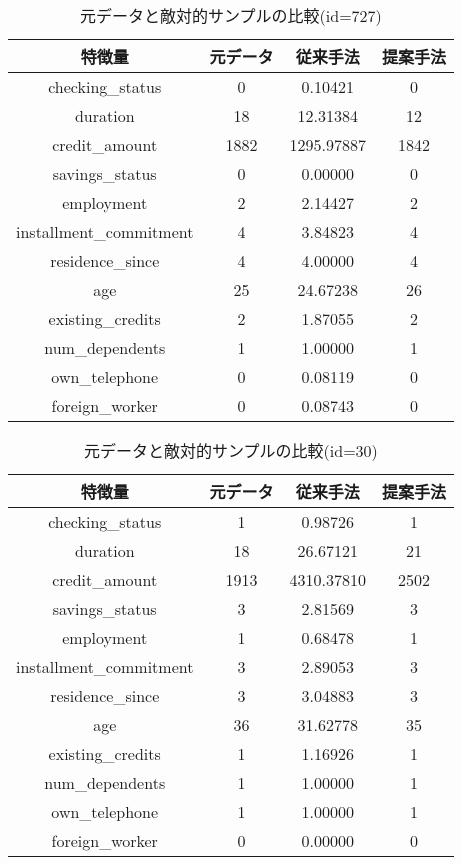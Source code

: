 \begin{table}[H]
    \centering
    \caption{元データと敵対的サンプルの比較(id=727)}
    \begin{tabular}{|c|c|c|c|} \hline
        特徴量 & 元データ & 従来手法 & 提案手法 \\ \hline
        checking\_status & 0 & 0.10421 & 0 \\ \hline
        duration & 18 & 12.31384 & 12 \\ \hline
        credit\_amount & 1882 & 1295.97887 & 1842 \\ \hline
        savings\_status & 0 & 0.00000 & 0 \\ \hline
        employment & 2 & 2.14427 & 2 \\ \hline
        installment\_commitment & 4 & 3.84823 & 4 \\ \hline
        residence\_since & 4 & 4.00000 & 4 \\ \hline
        age & 25 & 24.67238 & 26 \\ \hline
        existing\_credits & 2 & 1.87055 & 2 \\ \hline
        num\_dependents & 1 & 1.00000 & 1 \\ \hline
        own\_telephone & 0 & 0.08119 & 0 \\ \hline
        foreign\_worker & 0 & 0.08743 & 0 \\ \hline
    \end{tabular}
\end{table}

\begin{table}[H]
    \centering
    \caption{元データと敵対的サンプルの比較(id=30)}
    \begin{tabular}{|c|c|c|c|} \hline
        特徴量 & 元データ & 従来手法 & 提案手法 \\ \hline
        checking\_status & 1 & 0.98726 & 1 \\ \hline
        duration & 18 & 26.67121 & 21 \\ \hline
        credit\_amount & 1913 & 4310.37810 & 2502 \\ \hline
        savings\_status & 3 & 2.81569 & 3 \\ \hline
        employment & 1 & 0.68478 & 1 \\ \hline
        installment\_commitment & 3 & 2.89053 & 3 \\ \hline
        residence\_since & 3 & 3.04883 & 3 \\ \hline
        age & 36 & 31.62778 & 35 \\ \hline
        existing\_credits & 1 & 1.16926 & 1 \\ \hline
        num\_dependents & 1 & 1.00000 & 1 \\ \hline
        own\_telephone & 1 & 1.00000 & 1 \\ \hline
        foreign\_worker & 0 & 0.00000 & 0 \\ \hline
    \end{tabular}
\end{table}


